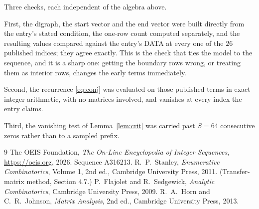 \documentclass[11pt,a4paper]{article}
\theoremstyle{plain}
\theoremstyle{definition}
\begin{document}
Three checks, each independent of the algebra above.

First, the digraph, the start vector and the end vector were built directly from the
entry's stated condition, the one-row count computed separately, and the resulting values
compared against the entry's DATA at every one of the $26$ published indices; they
agree exactly. This is the check that ties the model to the sequence, and it is a sharp one:
getting the boundary rows wrong, or treating them as interior rows, changes the early terms
immediately.

Second, the recurrence \eqref{eq:conj} was evaluated on those published terms in exact
integer arithmetic, with no matrices involved, and vanishes at every index the entry claims.

Third, the vanishing test of Lemma~\ref{lem:crit} was carried past $S=64$ consecutive
zeros rather than to a sampled prefix.

\begin{thebibliography}{9}
 The OEIS Foundation, \emph{The On-Line Encyclopedia of Integer
Sequences}, \url{https://oeis.org}, 2026. Sequence A316213.
 R.~P.~Stanley, \emph{Enumerative Combinatorics}, Volume 1, 2nd ed.,
Cambridge University Press, 2011. (Transfer-matrix method, Section 4.7.)
 P.~Flajolet and R.~Sedgewick, \emph{Analytic Combinatorics}, Cambridge
University Press, 2009.
 R.~A.~Horn and C.~R.~Johnson, \emph{Matrix Analysis}, 2nd ed., Cambridge
University Press, 2013.
\end{thebibliography}
\end{document}
